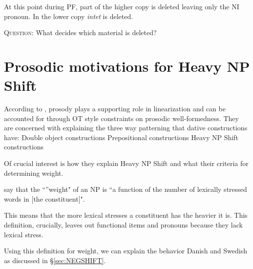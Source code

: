 \documentclass[12pt, letterpaper]{article}
\begin{document}
\ex At this point during PF, part of the higher copy is deleted leaving only the NI pronoun. In the lower copy \emph{intet} is deleted.\\
\label{ex:tree}

\z 

\begin{tcolorbox}[width=\linewidth]
\textsc{Question:} What decides which material is deleted?

\end{tcolorbox}

\section{Prosodic motivations for Heavy NP Shift} \label{sec:HNPS}

\ea According to \citet{anttilaRoleProsodyEnglish2010}, prosody plays a supporting role in linearization and can be accounted for through OT style constraints on prosodic well-formedness. 
\ex They are concerned with explaining the three way patterning that dative constructions have:
	\ea Double object constructions
	\ex Prepositional constructions
	\ex Heavy NP Shift constructions
	\z

\ex Of crucial interest is how they explain Heavy NP Shift and what their criteria for determining weight.

\ex \citet[949]{anttilaRoleProsodyEnglish2010} say that the ``''weight" of an NP is ``a function of the number of lexically stressed words in [the constituent]".

\ex This means that the more lexical stresses a constituent has the heavier it is. This definition, crucially, leaves out functional items and pronouns because they lack lexical stress. 

\ex Using this definition for weight, we can explain the behavior Danish and Swedish as discussed in §\ref{sec:NEGSHIFT}. 
\end{document}
